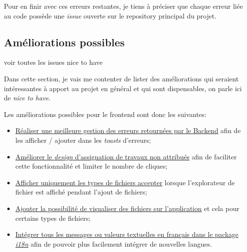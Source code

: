 \documentclass[
    iai, %
    il, %
]{heig-tb}
\begin{document}
Pour en finir avec ces erreurs restantes, je tiens à préciser que chaque erreur liée au code possède une \emph{issue} ouverte sur le \Gls{repository} principal du projet.

\subsection{Améliorations possibles}
voir toutes les issues nice to have

Dans cette section, je vais me contenter de lister des améliorations qui seraient intéressantes à apport au projet en général et qui sont dispensables, on parle ici de \emph{nice to have}.

Les améliorations possibles pour le \Gls{frontend} sont donc les suivantes:
\begin{itemize}
    \item \href{https://github.com/heig-fablab/fablab-manager/issues/78}{Réaliser une meilleure gestion des erreurs retournées par le Backend} afin de les afficher / ajouter dans les \emph{toasts} d'erreurs;
    \item \href{https://github.com/heig-fablab/fablab-manager/issues/141}{Améliorer le \emph{design} d'assignation de travaux non attribués} afin de faciliter cette fonctionnalité et limiter le nombre de cliques;
    \item \href{https://github.com/heig-fablab/fablab-manager/issues/156}{Afficher uniquement les types de fichiers accepter} lorsque l'explorateur de fichier est affiché pendant l'ajout de fichiers;
    \item \href{https://github.com/heig-fablab/fablab-manager/issues/122}{Ajouter la possibilité de visualiser des fichiers sur l'application} et cela pour certains types de fichiers;
    \item \href{https://github.com/heig-fablab/fablab-manager/issues/74}{Intégrer tous les messages ou valeurs textuelles en français dans le package \emph{i18n}} afin de pouvoir plus facilement intégrer de nouvelles langues.
\end{itemize}
\end{document}
